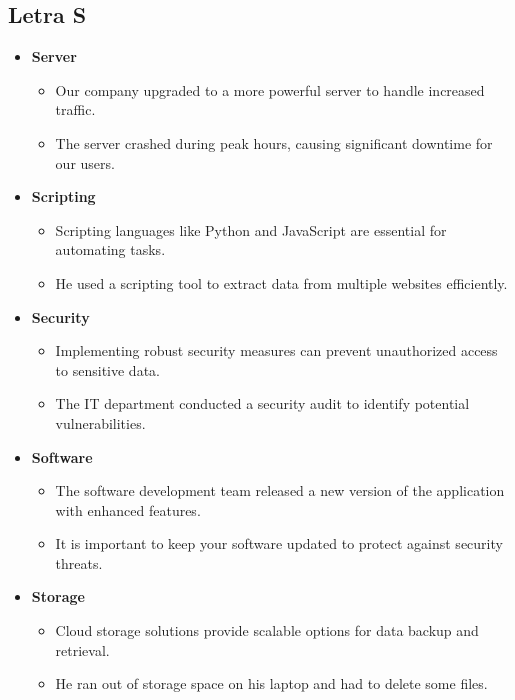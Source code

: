     \subsection{Letra S}
    \begin{itemize}
        \item \textbf{Server}
        \begin{itemize}
            \item Our company upgraded to a more powerful server to handle increased traffic.
            \item The server crashed during peak hours, causing significant downtime for our users.
        \end{itemize}
        \item \textbf{Scripting}
        \begin{itemize}
            \item Scripting languages like Python and JavaScript are essential for automating tasks.
            \item He used a scripting tool to extract data from multiple websites efficiently.
        \end{itemize}
        \item \textbf{Security}
        \begin{itemize}
            \item Implementing robust security measures can prevent unauthorized access to sensitive data. 
            \item The IT department conducted a security audit to identify potential vulnerabilities.
        \end{itemize}
        \item \textbf{Software}
        \begin{itemize}
            \item The software development team released a new version of the application with enhanced features. 
            \item It is important to keep your software updated to protect against security threats.
        \end{itemize}
        \item \textbf{Storage}
        \begin{itemize}
            \item Cloud storage solutions provide scalable options for data backup and retrieval. 
            \item He ran out of storage space on his laptop and had to delete some files.

\end{itemize}
\end{itemize}
